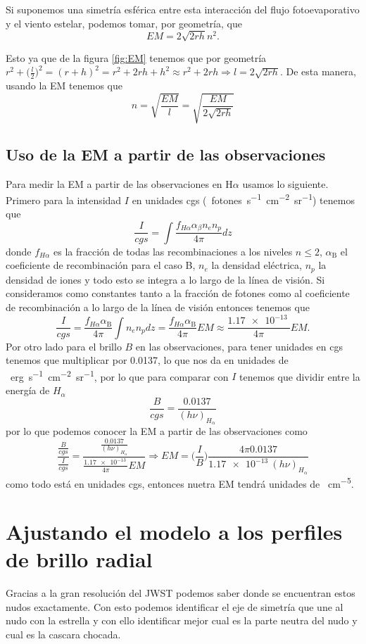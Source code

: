 \documentclass{book}
\begin{document}
Si suponemos una simetría esférica entre esta interacción del flujo fotoevaporativo y el viento estelar, podemos tomar, por geometría, que
\[EM=2\sqrt{2rh}n^2.\]


Esto ya que de la figura \ref{fig:EM} tenemos que por geometría $r^2+\Big(\frac{l}{2}\Big)^2=(r+h)^2=r^2+2rh+h^2\approx r^2+2rh\Rightarrow l=2\sqrt{2rh}$. De esta manera, usando la EM tenemos que \[n=\sqrt{\frac{EM}{l}}=\sqrt{\frac{EM}{2\sqrt{2rh}}}\] 

\subsection{Uso de la EM a partir de las observaciones}

Para medir la EM a partir de las observaciones en H$\alpha$ usamos lo siguiente. Primero para la intensidad $I$ en unidades cgs (\SI{}{fotones.s^{-1}.cm^{-2}.sr^{-1}}) tenemos que
\[\frac{I}{cgs}=\int \frac{f_{H\alpha}\alpha_\beta n_e n_p}{4\pi}dz\] donde $f_{H\alpha}$ es la fracción de todas las recombinaciones a los niveles $n\le 2$, $\alpha_\mathrm{B}$ el coeficiente de recombinación para el caso B, $n_e$ la densidad eléctrica, $n_p$ la densidad de iones y todo esto se integra a lo largo de la línea de visión. Si consideramos como constantes tanto a la fracción de fotones como al coeficiente de recombinación a lo largo de la línea de visión entonces tenemos que
\[\frac{I}{cgs}=\frac{f_{H\alpha}\alpha_\mathrm{B}}{4\pi}\int n_en_pdz=\frac{f_{H\alpha}\alpha_\mathrm{B}}{4\pi} EM \approx \frac{\SI{1.17e-13}{}}{4\pi}EM.\]
Por otro lado para el brillo $B$ en las observaciones, para tener unidades en cgs tenemos que multiplicar por 0.0137, lo que nos da en unidades de \SI{}{erg.s^{-1}.cm^{-2}.sr^{-1}}, por lo que para comparar con $I$ tenemos que dividir entre la energía de $H_\alpha$
\[\frac{B}{cgs}=\frac{0.0137}{(h\nu)_{H_\alpha}}\] por lo que podemos conocer la EM a partir de las observaciones como 
\[\frac{\frac{B}{cgs}}{\frac{I}{cgs}}=\frac{\frac{0.0137}{(h\nu)_{H_\alpha}}}{\frac{\SI{1.17e-13}{}}{4\pi}EM}\Rightarrow EM = \Big(\frac{I}{B}\Big)\frac{4\pi 0.0137}{\SI{1.17e-13}{}(h\nu)_{H_\alpha}}\] como todo está en unidades cgs, entonces nuetra EM tendrá unidades de \SI{}{cm^{-5}}.

\section{Ajustando el modelo a los perfiles de brillo radial}

Gracias a la gran resolución del JWST podemos saber donde se encuentran estos nudos exactamente. Con esto podemos identificar el eje de simetría que une al nudo con la estrella y con ello identificar mejor cual es la parte neutra del nudo y cual es la cascara chocada.
\end{document}
